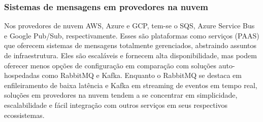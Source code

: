 \subsubsection{Sistemas de mensagens em provedores na nuvem}

Nos provedores de nuvem AWS, Azure e GCP, tem-se o SQS, Azure Service Bus e Google Pub/Sub, respectivamente. Esses são plataformas como serviços (PAAS) que oferecem sistemas de mensagens totalmente gerenciados, abstraindo assuntos de infraestrutura. Eles são escaláveis e fornecem alta disponibilidade, mas podem oferecer menos opções de configuração em comparação com soluções auto-hospedadas como RabbitMQ e Kafka. Enquanto o RabbitMQ se destaca em enfileiramento de baixa latência e Kafka em streaming de eventos em tempo real, soluções em provedores na nuvem tendem a se concentrar em simplicidade, escalabilidade e fácil integração com outros serviços em seus respectivos ecossistemas.








